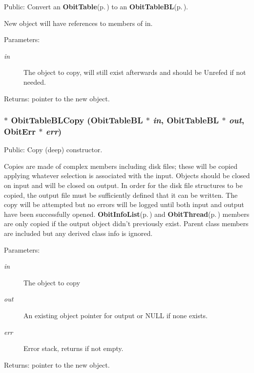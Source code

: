 Public: Convert an {\bf Obit\-Table}{\rm (p.\,\pageref{structObitTable})} to an {\bf Obit\-Table\-BL}{\rm (p.\,\pageref{structObitTableBL})}. 

New object will have references to members of in. \begin{Desc}
\item[Parameters:]
\begin{description}
\item[{\em in}]The object to copy, will still exist afterwards and should be Unrefed if not needed. \end{description}
\end{Desc}
\begin{Desc}
\item[Returns:]pointer to the new object. \end{Desc}
\subsubsection{$\ast$ Obit\-Table\-BLCopy ({\bf Obit\-Table\-BL} $\ast$ {\em in}, {\bf Obit\-Table\-BL} $\ast$ {\em out}, {\bf Obit\-Err} $\ast$ {\em err})}\label{ObitTableBL_8h_a14}


Public: Copy (deep) constructor. 

Copies are made of complex members including disk files; these will be copied applying whatever selection is associated with the input. Objects should be closed on input and will be closed on output. In order for the disk file structures to be copied, the output file must be sufficiently defined that it can be written. The copy will be attempted but no errors will be logged until both input and output have been successfully opened. {\bf Obit\-Info\-List}{\rm (p.\,\pageref{structObitInfoList})} and {\bf Obit\-Thread}{\rm (p.\,\pageref{structObitThread})} members are only copied if the output object didn't previously exist. Parent class members are included but any derived class info is ignored. \begin{Desc}
\item[Parameters:]
\begin{description}
\item[{\em in}]The object to copy \item[{\em out}]An existing object pointer for output or NULL if none exists. \item[{\em err}]Error stack, returns if not empty. \end{description}
\end{Desc}
\begin{Desc}
\item[Returns:]pointer to the new object. \end{Desc}
